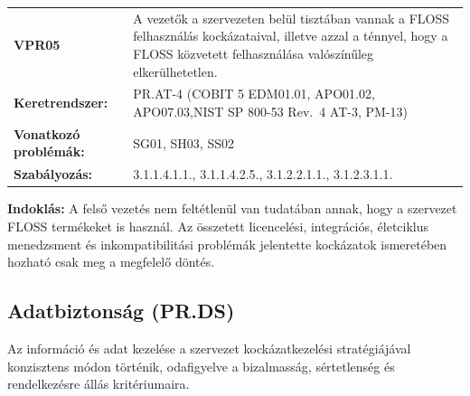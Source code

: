 \documentclass[12pt,magyar,a4paper,oneside]{scrreprt}
\begin{document}
\begin{longtable}[]{@{}ll@{}}
\toprule
\endhead
\begin{minipage}[t]{0.16\columnwidth}\raggedright
\textbf{VPR05}\strut
\end{minipage} & \begin{minipage}[t]{0.79\columnwidth}\raggedright
A vezetők a szervezeten belül tisztában vannak a FLOSS felhasználás
kockázataival, illetve azzal a ténnyel, hogy a FLOSS közvetett
felhasználása valószínűleg elkerülhetetlen.\strut
\end{minipage}\tabularnewline
\begin{minipage}[t]{0.16\columnwidth}\raggedright
\textbf{Keretrendszer:}\strut
\end{minipage} & \begin{minipage}[t]{0.79\columnwidth}\raggedright
PR.AT-4 (COBIT 5 EDM01.01, APO01.02, APO07.03,NIST SP 800-53 Rev.~4
AT-3, PM-13)\strut
\end{minipage}\tabularnewline
\begin{minipage}[t]{0.16\columnwidth}\raggedright
\textbf{Vonatkozó problémák:}\strut
\end{minipage} & \begin{minipage}[t]{0.79\columnwidth}\raggedright
SG01, SH03, SS02\strut
\end{minipage}\tabularnewline
\begin{minipage}[t]{0.16\columnwidth}\raggedright
\textbf{Szabályozás:}\strut
\end{minipage} & \begin{minipage}[t]{0.79\columnwidth}\raggedright
3.1.1.4.1.1., 3.1.1.4.2.5., 3.1.2.2.1.1., 3.1.2.3.1.1.\strut
\end{minipage}\tabularnewline
\bottomrule
\end{longtable}

\textbf{Indoklás: } A felső vezetés nem feltétlenül van tudatában annak,
hogy a szervezet FLOSS termékeket is használ. Az összetett licencelési,
integrációs, életciklus menedzsment és inkompatibilitási problémák
jelentette kockázatok ismeretében hozható csak meg a megfelelő döntés.

\hypertarget{adatbiztonsuxe1g-pr.ds}{%
\subsection{Adatbiztonság (PR.DS)}\label{adatbiztonsuxe1g-pr.ds}}

Az információ és adat kezelése a szervezet kockázatkezelési
stratégiájával konzisztens módon történik, odafigyelve a bizalmasság,
sértetlenség és rendelkezésre állás kritériumaira.
\end{document}
